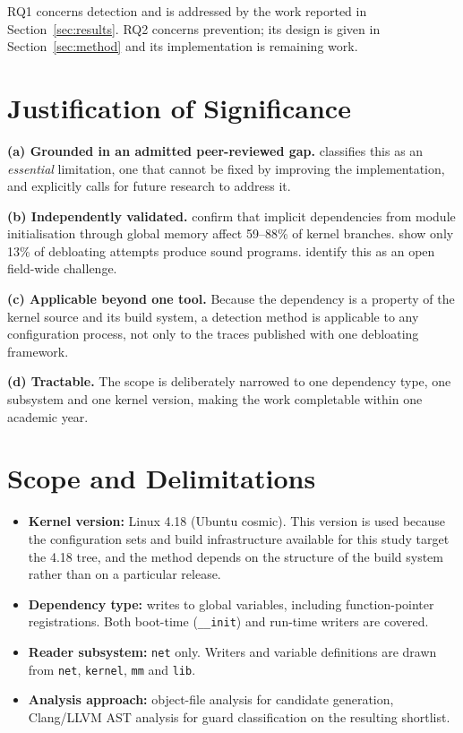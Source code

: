 \documentclass[12pt, a4paper, oneside]{book}
\begin{document}
RQ1 concerns detection and is addressed by the work reported in
Section~\ref{sec:results}. RQ2 concerns prevention; its design is given in
Section~\ref{sec:method} and its implementation is remaining work.

\section{Justification of Significance}

\textbf{(a) Grounded in an admitted peer-reviewed gap.} \citet{kuo2022dissertation}
classifies this as an \textit{essential} limitation, one that cannot be fixed by
improving the implementation, and explicitly calls for future research to address it.

\textbf{(b) Independently validated.} \citet{hao2022demystifying} confirm that
implicit dependencies from module initialisation through global memory affect
59--88\% of kernel branches. \citet{brown2024broad} show only 13\% of debloating
attempts produce sound programs. \citet{alhanahnah2024sok} identify this as an
open field-wide challenge.

\textbf{(c) Applicable beyond one tool.} Because the dependency is a property of
the kernel source and its build system, a detection method is applicable to any
configuration process, not only to the traces published with one debloating
framework.

\textbf{(d) Tractable.} The scope is deliberately narrowed to one dependency
type, one subsystem and one kernel version, making the work completable within
one academic year.

\section{Scope and Delimitations}

\begin{itemize}[leftmargin=*, itemsep=2pt]
  \item \textbf{Kernel version:} Linux 4.18 (Ubuntu cosmic). This version is used because the configuration sets and build infrastructure available for this study
        target the 4.18 tree, and the method depends on the structure of
        the build system rather than on a particular release.
  \item \textbf{Dependency type:} writes to global variables, including
        function-pointer registrations. Both boot-time (\texttt{\_\_init}) and
        run-time writers are covered.
  \item \textbf{Reader subsystem:} \texttt{net} only. Writers and variable
        definitions are drawn from \texttt{net}, \texttt{kernel}, \texttt{mm}
        and \texttt{lib}.
  \item \textbf{Analysis approach:} object-file analysis for candidate
        generation, Clang/LLVM AST analysis for guard classification on the
        resulting shortlist.
\end{itemize}
\end{document}
